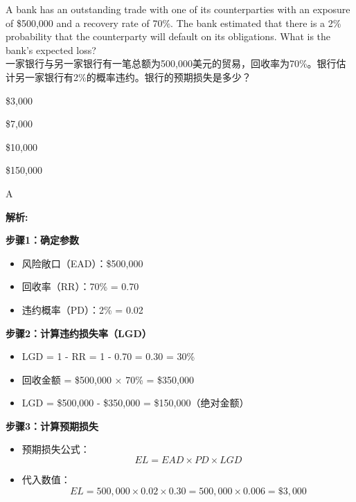 \documentclass{article}
\newcounter{question} %
\newenvironment{explanation}
{\textbf{解析:}\par}
{\par}
\begin{document}
\begin{question}
    A bank has an outstanding trade with one of its counterparties with an exposure of \$500,000 and a recovery rate of 70\%. The bank estimated that there is a 2\% probability that the counterparty will default on its obligations. What is the bank's expected loss?
    \\ 一家银行与另一家银行有一笔总额为500,000美元的贸易，回收率为70\%。银行估计另一家银行有2\%的概率违约。银行的预期损失是多少？
\end{question}

\begin{choices}
    \item \$3,000
    \item \$7,000
    \item \$10,000
    \item \$150,000
\end{choices}

\begin{correctanswer}
    A
\end{correctanswer}

\begin{explanation}
    \textbf{步骤1：确定参数}
    \begin{itemize}
        \item 风险敞口（EAD）：\$500{,}000
        \item 回收率（RR）：70\% = 0.70
        \item 违约概率（PD）：2\% = 0.02
    \end{itemize}

    \textbf{步骤2：计算违约损失率（LGD）}
    \begin{itemize}
        \item LGD = 1 - RR = 1 - 0.70 = 0.30 = 30\%
        \item 回收金额 = \$500{,}000 × 70\% = \$350{,}000
        \item LGD = \$500{,}000 - \$350{,}000 = \$150{,}000（绝对金额）
    \end{itemize}

    \textbf{步骤3：计算预期损失}
    \begin{itemize}
        \item 预期损失公式：
        \[
        EL = EAD \times PD \times LGD
        \]
        \item 代入数值：
        \[
        EL = 500{,}000 \times 0.02 \times 0.30 = 500{,}000 \times 0.006 = \$3{,}000
        \]
    \end{itemize}
    
\end{explanation}
\end{document}
